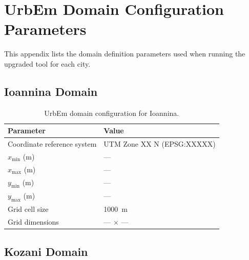 
\chapter{UrbEm Domain Configuration Parameters}
\label{app:domain}

This appendix lists the domain definition parameters used when running the
upgraded \urbem{} tool for each city.

\section{Ioannina Domain}
\label{app:domain_ioannina}


\begin{table}[h]
  \centering
  \caption{UrbEm domain configuration for Ioannina.}
  \label{tab:domain_ioannina}
  \begin{tabular}{ll}
    \toprule
    \textbf{Parameter}          & \textbf{Value} \\
    \midrule
    Coordinate reference system & UTM Zone XX N (EPSG:XXXXX) \\
    $x_{\min}$ (m)              & --- \\
    $x_{\max}$ (m)              & --- \\
    $y_{\min}$ (m)              & --- \\
    $y_{\max}$ (m)              & --- \\
    Grid cell size              & \SI{1000}{\metre} \\
    Grid dimensions             & --- $\times$ --- \\
    \bottomrule
  \end{tabular}
\end{table}

\section{Kozani Domain}
\label{app:domain_kozani}


